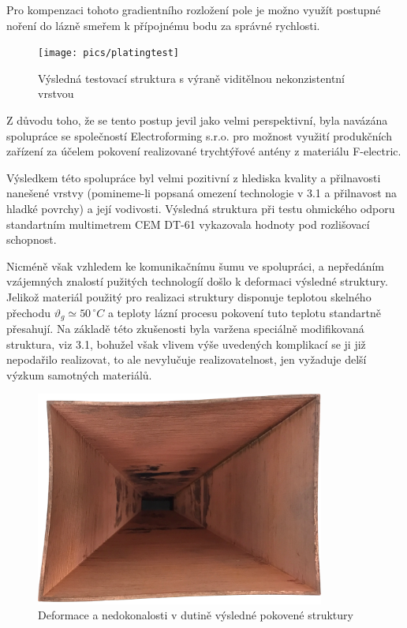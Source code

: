 Pro kompenzaci tohoto gradientního rozložení pole je možno využít postupné noření do lázně smeřem k přípojnému bodu za správné rychlosti.
\begin{figure}[h]
\begin{center}
\texttt{[image: pics/platingtest]}
\caption{Výsledná testovací struktura s výraně viditělnou nekonzistentní vrstvou}
\label{fig:platingtest}
\end{center}
\end{figure}

Z důvodu toho, že se tento postup jevil jako velmi perspektivní, byla navázána spolupráce se společností Electroforming s.r.o. pro možnost využití produkčních zařízení za účelem pokovení realizované trychtýřové antény z materiálu F-electric.

Výsledkem této spolupráce byl velmi pozitivní z hlediska kvality a přilnavosti nanešené vrstvy (pomineme-li popsaná omezení technologie v 3.1 a přilnavost na hladké povrchy) a její vodivosti. Výsledná struktura při testu ohmického odporu standartním multimetrem CEM DT-61 vykazovala hodnoty pod rozlišovací schopnost.

Nicméně však vzhledem ke komunikačnímu šumu ve spolupráci, a nepředáním vzájemných znalostí pužitých technologíí došlo k deformaci výsledné struktury. Jelikož materiál použitý pro realizaci struktury disponuje teplotou skelného přechodu $\vartheta_g \simeq 50\,^\circ$$C$ a teploty lázní procesu pokovení tuto teplotu standartně přesahují. Na základě této zkušenosti byla varžena speciálně modifikovaná struktura, viz 3.1, bohužel však vlivem výše uvedených komplikací se ji již nepodařilo realizovat, to ale nevylučuje realizovatelnost, jen vyžaduje delší výzkum samotných materiálů.


\begin{figure}[h]
\begin{center}
\includegraphics[width=9.5cm]{pics/plated/deform}
\caption{Deformace a nedokonalosti v dutině výsledné pokovené struktury}
\label{fig:PLdef}
\end{center}
\end{figure}

